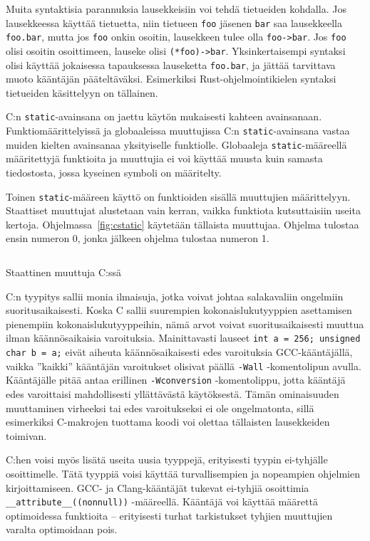 Muita syntaktisia parannuksia lausekkeisiin voi tehdä tietueiden kohdalla. Jos
lausekkeessa käyttää tietuetta, niin tietueen \texttt{foo} jäsenen \texttt{bar}
saa lausekkeella \texttt{foo.bar}, mutta jos \texttt{foo} onkin osoitin,
lausekkeen tulee olla \texttt{foo->bar}. Jos \texttt{foo} olisi osoitin
osoittimeen, lauseke olisi \texttt{(*foo)->bar}. Yksinkertaisempi syntaksi
olisi käyttää jokaisessa tapauksessa lauseketta \texttt{foo.bar}, ja jättää
tarvittava muoto kääntäjän pääteltäväksi. Esimerkiksi Rust-ohjelmointikielen
syntaksi tietueiden käsittelyyn on tällainen.

C:n \texttt{static}-avainsana on jaettu käytön mukaisesti kahteen avainsanaan.
Funktiomäärittelyissä ja globaaleissa muuttujissa C:n
\texttt{static}-avainsana vastaa muiden kielten avainsanaa yksityiselle
funktiolle. Globaaleja \texttt{static}-määreellä määritettyjä funktioita ja
muuttujia ei voi käyttää muusta kuin samasta tiedostosta, jossa kyseinen
symboli on määritelty.

Toinen \texttt{static}-määreen käyttö on funktioiden sisällä muuttujien
määrittelyyn. Staattiset muuttujat alustetaan vain kerran, vaikka funktiota
kutsuttaisiin useita kertoja. Ohjelmassa~\ref{fig:cstatic} käytetään tällaista
muuttujaa. Ohjelma tulostaa ensin numeron 0, jonka jälkeen ohjelma tulostaa
numeron 1.

\begin{listing}[ht!]
    \inputminted{C}{koodi/static.c}
    \caption{Staattinen muuttuja C:ssä}
    \label{fig:cstatic}
\end{listing}

\grayrule

C:n tyypitys sallii monia ilmaisuja, jotka voivat johtaa salakavaliin ongelmiin
suoritusaikaisesti. Koska C sallii suurempien kokonaislukutyyppien asettamisen
pienempiin kokonaislukutyyppeihin, nämä arvot voivat suoritusaikaisesti muuttua
ilman käännösaikaisia varoituksia. Mainittavasti lauseet \texttt{int a = 256;
unsigned char b = a;} eivät aiheuta käännösaikaisesti edes varoituksia
GCC-kääntäjällä, vaikka ''kaikki'' kääntäjän varoitukset olisivat päällä
\texttt{-Wall} -komentolipun avulla. Kääntäjälle pitää antaa erillinen
\texttt{-Wconversion} -komentolippu, jotta kääntäjä edes varoittaisi
mahdollisesti yllättävästä käytöksestä. Tämän ominaisuuden muuttaminen
virheeksi tai edes varoitukseksi ei ole ongelmatonta, sillä esimerkiksi
C-makrojen tuottama koodi voi olettaa tällaisten lausekkeiden toimivan.

C:hen voisi myös lisätä useita uusia tyyppejä, erityisesti tyypin ei-tyhjälle
osoittimelle. Tätä tyyppiä voisi käyttää turvallisempien ja nopeampien
ohjelmien kirjoittamiseen. GCC- ja Clang-kääntäjät tukevat ei-tyhjiä osoittimia
\texttt{\_\_attribute\_\_((nonnull))} -määreellä. Kääntäjä voi käyttää määrettä
optimoidessa funktioita -- erityisesti turhat tarkistukset tyhjien muuttujien
varalta optimoidaan pois.

